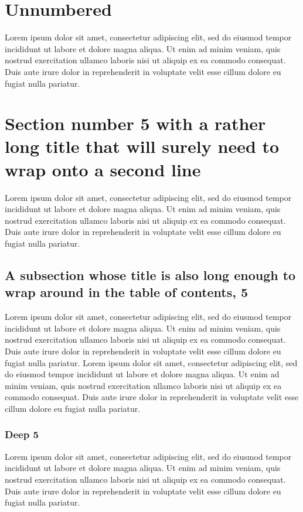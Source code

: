 \documentclass[11pt]{article}
\begin{document}
\section*{Unnumbered}
Lorem ipsum dolor sit amet, consectetur adipiscing elit, sed do eiusmod tempor incididunt ut labore et dolore magna aliqua. Ut enim ad minim veniam, quis nostrud exercitation ullamco laboris nisi ut aliquip ex ea commodo consequat. Duis aute irure dolor in reprehenderit in voluptate velit esse cillum dolore eu fugiat nulla pariatur.

\section{Section number 5 with a rather long title that will surely need to wrap onto a second line}
Lorem ipsum dolor sit amet, consectetur adipiscing elit, sed do eiusmod tempor incididunt ut labore et dolore magna aliqua. Ut enim ad minim veniam, quis nostrud exercitation ullamco laboris nisi ut aliquip ex ea commodo consequat. Duis aute irure dolor in reprehenderit in voluptate velit esse cillum dolore eu fugiat nulla pariatur.

\subsection{A subsection whose title is also long enough to wrap around in the table of contents, 5}
Lorem ipsum dolor sit amet, consectetur adipiscing elit, sed do eiusmod tempor incididunt ut labore et dolore magna aliqua. Ut enim ad minim veniam, quis nostrud exercitation ullamco laboris nisi ut aliquip ex ea commodo consequat. Duis aute irure dolor in reprehenderit in voluptate velit esse cillum dolore eu fugiat nulla pariatur. Lorem ipsum dolor sit amet, consectetur adipiscing elit, sed do eiusmod tempor incididunt ut labore et dolore magna aliqua. Ut enim ad minim veniam, quis nostrud exercitation ullamco laboris nisi ut aliquip ex ea commodo consequat. Duis aute irure dolor in reprehenderit in voluptate velit esse cillum dolore eu fugiat nulla pariatur.

\subsubsection{Deep 5}
Lorem ipsum dolor sit amet, consectetur adipiscing elit, sed do eiusmod tempor incididunt ut labore et dolore magna aliqua. Ut enim ad minim veniam, quis nostrud exercitation ullamco laboris nisi ut aliquip ex ea commodo consequat. Duis aute irure dolor in reprehenderit in voluptate velit esse cillum dolore eu fugiat nulla pariatur.
\end{document}
